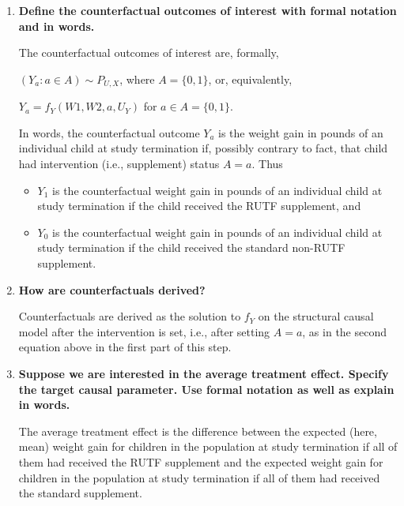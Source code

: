\documentclass{article}\usepackage[]{graphicx}\usepackage[]{xcolor}
\begin{document}
  \begin{enumerate}[label=\textbf{\alph*.}]
  
    \item \textbf{Define the counterfactual outcomes of interest with formal notation and in words.}
    
    The counterfactual outcomes of interest are, formally, 
    
    $(Y_a : a \in A) \sim P_{U,X}$, where $A = \{0, 1\}$, or, equivalently,
    
    $Y_a = f_{Y}(W1, W2, a, U_Y)$ for $a \in A = \{0, 1\}.$
    
    In words, the counterfactual outcome $Y_a$ is the weight gain in pounds of an individual child at study termination if, possibly contrary to fact, that child had intervention (i.e., supplement) status $A = a$.  Thus
    
    \begin{itemize}
    
      \item $Y_1$ is the counterfactual weight gain in pounds of an individual child at study termination if the child received the RUTF supplement, and
      
      \item $Y_0$ is the counterfactual weight gain in pounds of an individual child at study termination if the child received the standard non-RUTF supplement.
      
    \end{itemize}

    \item \textbf{How are counterfactuals derived?}
    
    Counterfactuals are derived as the solution to $f_Y$ on the structural causal model after the intervention is set, i.e., after setting $A = a$, as in the second equation above in the first part of this step.
    
    \item \textbf{Suppose we are interested in the average treatment effect. Specify the target causal parameter. Use formal notation as well as explain in words.}
    
    The average treatment effect is the difference between the expected (here, mean) weight gain for children in the population at study termination if all of them had received the RUTF supplement and the expected weight gain for children in the population at study termination if all of them had received the standard supplement.
    

\end{enumerate}
\end{document}
